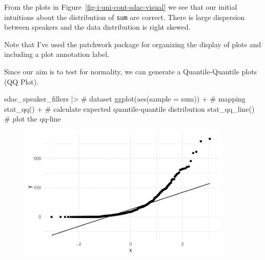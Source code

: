 \documentclass[
  letterpaper,
]{latex/krantz}
\newenvironment{Shaded}{\begin{snugshade}}{\end{snugshade}}
\newcommand{\AttributeTok}[1]{\textcolor[rgb]{0.40,0.45,0.13}{#1}}
\newcommand{\CommentTok}[1]{\textcolor[rgb]{0.37,0.37,0.37}{#1}}
\newcommand{\FunctionTok}[1]{\textcolor[rgb]{0.28,0.35,0.67}{#1}}
\newcommand{\NormalTok}[1]{\textcolor[rgb]{0.00,0.23,0.31}{#1}}
\newcommand{\SpecialCharTok}[1]{\textcolor[rgb]{0.37,0.37,0.37}{#1}}
\begin{document}
From the plots in Figure~\ref{fig-i-uni-cont-sdac-visual} we see that
our initial intuitions about the distribution of \texttt{sum} are
correct. There is large dispersion between speakers and the data
distribution is right skewed.

\begin{tcolorbox}[enhanced jigsaw, toprule=.15mm, bottomtitle=1mm, coltitle=black, title=\textcolor{quarto-callout-warning-color}{\faExclamationTriangle}\hspace{0.5em}{Tip}, left=2mm, colframe=quarto-callout-warning-color-frame, bottomrule=.15mm, colbacktitle=quarto-callout-warning-color!10!white, leftrule=.75mm, colback=white, titlerule=0mm, breakable, toptitle=1mm, opacityback=0, arc=.35mm, rightrule=.15mm, opacitybacktitle=0.6]

Note that I've used the patchwork package for organizing the display of
plots and including a plot annotation label.

\end{tcolorbox}

Since our aim is to test for normality, we can generate a
Quantile-Quantile plots (QQ Plot).

\begin{Shaded}
\begin{Highlighting}[]
\NormalTok{sdac\_speaker\_fillers }\SpecialCharTok{|\textgreater{}} \CommentTok{\# dataset}
  \FunctionTok{ggplot}\NormalTok{(}\FunctionTok{aes}\NormalTok{(}\AttributeTok{sample =}\NormalTok{ sum)) }\SpecialCharTok{+} \CommentTok{\# mapping}
  \FunctionTok{stat\_qq}\NormalTok{() }\SpecialCharTok{+} \CommentTok{\# calculate expected quantile{-}quantile distribution}
  \FunctionTok{stat\_qq\_line}\NormalTok{() }\CommentTok{\# plot the qq{-}line}
\end{Highlighting}
\end{Shaded}

\begin{figure}[H]

{\centering \includegraphics[width=0.9\textwidth,height=\textheight]{./inference_files/figure-pdf/i-uni-cont-sdac-qq-plot-1.pdf}

}

\end{figure}
\end{document}
